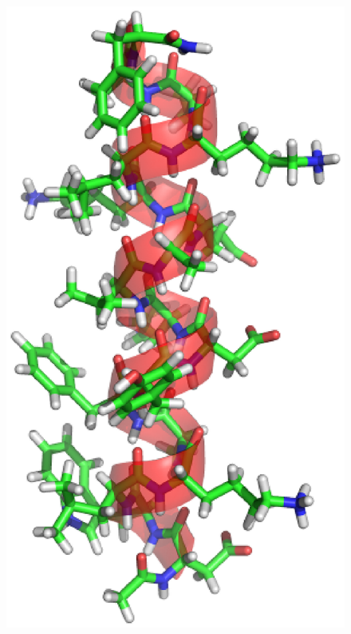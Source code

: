 \begin{figure}
\begin{center}
{\begin{minipage}{0.3\textwidth}
\includegraphics[width=\textwidth]{./img/2fq8-600.eps}
\end{minipage}}
\end{center}
\end{figure}
